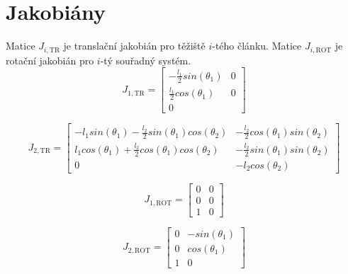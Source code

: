 \documentclass[twoside]{article}
\begin{document}
\section{Jakobiány}

Matice $J_{i, \text{TR}}$ je translační jakobián pro těžiště $i$-tého článku.
Matice $J_{i, \text{ROT}}$ je rotační jakobián pro $i$-tý souřadný systém.
\begin{equation}
	J_{1, \text{TR}} = \begin{bmatrix}
		-\frac{l_1}{2} sin(\theta_1) & 0 \\
		\frac{l_1}{2} cos(\theta_1) & 0 \\
		0
	\end{bmatrix}
\end{equation}

\begin{equation}
	J_{2, \text{TR}} = \begin{bmatrix}
		-l_1 sin(\theta_1) - \frac{l_2}{2} sin(\theta_1) cos(\theta_2) & -\frac{l_2}{2} cos(\theta_1) sin(\theta_2) \\
		l_1 cos(\theta_1) + \frac{l_2}{2} cos(\theta_1) cos(\theta_2) & -\frac{l_2}{2} sin(\theta_1) sin(\theta_2) \\
		0 & - l_2 cos(\theta_2)
	\end{bmatrix}
\end{equation}

\begin{equation}
	J_{1, \text{ROT}} = \begin{bmatrix}
		0 & 0 \\ 
		0 & 0 \\ 
		1 & 0
	\end{bmatrix}
\end{equation}

\begin{equation}
	J_{2, \text{ROT}} = \begin{bmatrix}
		0 & -sin(\theta_1) \\
		0 & cos(\theta_1) \\
		1 & 0
	\end{bmatrix}
\end{equation}
\end{document}
